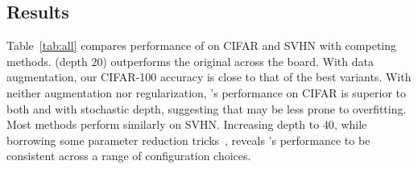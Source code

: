 \begin{figure}
   \begin{minipage}[b]{0.45\linewidth}
      \vspace{0pt}
      \begin{center}
      
      \end{center}
      \vspace{-0.04\linewidth}
      \label{tab:imagenet}
      \vspace{0.03\linewidth}
      \begin{center}
      
      \end{center}
      \vspace{-0.04\linewidth}
      \label{tab:columns}
   \end{minipage}
   \hfill
   \begin{minipage}[b]{0.51\linewidth}
      \vspace{0pt}
      \begin{center}
      
      \end{center}
      \vspace{-0.02\linewidth}
      \label{tab:individual}
   \end{minipage}
\end{figure}

\subsection{Results}
\label{sec:evaluation}

Table~\ref{tab:all} compares performance of {\fracnet} on CIFAR and SVHN with
competing methods.  {\Fracnet} (depth $20$) outperforms the original {\resnet}
across the board.  With data augmentation, our CIFAR-100 accuracy is close to
that of the best {\resnet} variants.  With neither augmentation nor
regularization, {\fracnet}'s performance on CIFAR is superior to both {\resnet}
and {\resnet} with stochastic depth, suggesting that {\fracnet} may be less
prone to overfitting.  Most methods perform similarly on SVHN.  Increasing
depth to $40$, while borrowing some parameter reduction tricks~\citep{
SqueezeNet}, reveals {\fracnet}'s performance to be consistent across a range
of configuration choices.

